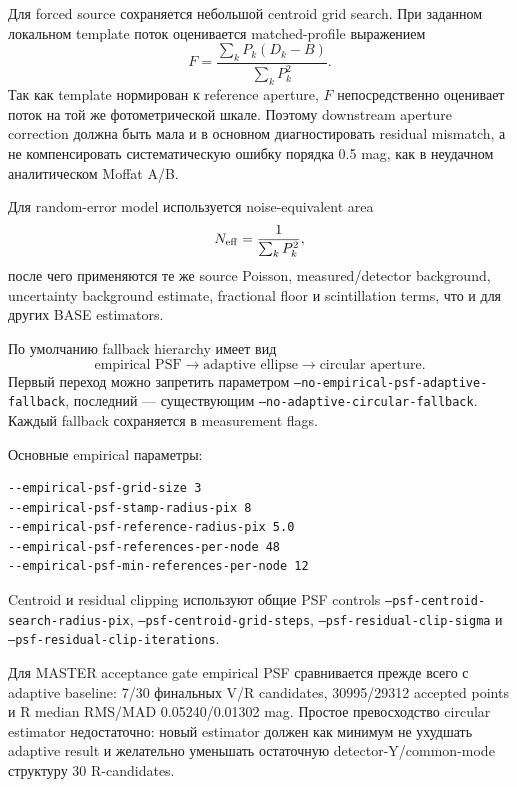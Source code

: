 Для forced source сохраняется небольшой centroid grid search. При заданном локальном template
поток оценивается matched-profile выражением
\begin{equation}
 F=\frac{\sum_k P_k(D_k-B)}{\sum_k P_k^2}.
\end{equation}
Так как template нормирован к reference aperture, $F$ непосредственно оценивает поток на той же
фотометрической шкале. Поэтому downstream aperture correction должна быть мала и в основном
диагностировать residual mismatch, а не компенсировать систематическую ошибку порядка 0.5 mag,
как в неудачном аналитическом Moffat A/B.

Для random-error model используется noise-equivalent area
\begin{equation}
 N_{\rm eff}=\frac{1}{\sum_k P_k^2},
\end{equation}
после чего применяются те же source Poisson, measured/detector background, uncertainty background
estimate, fractional floor и scintillation terms, что и для других BASE estimators.

По умолчанию fallback hierarchy имеет вид
\begin{equation}
 \text{empirical PSF}\rightarrow\text{adaptive ellipse}\rightarrow\text{circular aperture}.
\end{equation}
Первый переход можно запретить параметром
\texttt{--no-empirical-psf-adaptive-fallback}, последний --- существующим
\texttt{--no-adaptive-circular-fallback}. Каждый fallback сохраняется в measurement flags.

Основные empirical параметры:
\begin{lstlisting}
--empirical-psf-grid-size 3
--empirical-psf-stamp-radius-pix 8
--empirical-psf-reference-radius-pix 5.0
--empirical-psf-references-per-node 48
--empirical-psf-min-references-per-node 12
\end{lstlisting}
Centroid и residual clipping используют общие PSF controls
\texttt{--psf-centroid-search-radius-pix}, \texttt{--psf-centroid-grid-steps},
\texttt{--psf-residual-clip-sigma} и \texttt{--psf-residual-clip-iterations}.

Для MASTER acceptance gate empirical PSF сравнивается прежде всего с adaptive baseline:
7/30 финальных V/R candidates, 30995/29312 accepted points и R median RMS/MAD
0.05240/0.01302 mag. Простое превосходство circular estimator недостаточно: новый estimator должен
как минимум не ухудшать adaptive result и желательно уменьшать остаточную detector-Y/common-mode
структуру 30 R-candidates.


